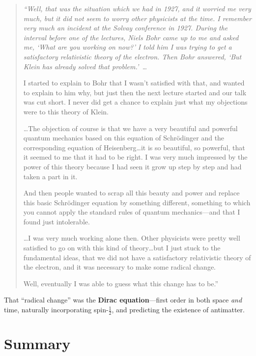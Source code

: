 \documentclass[12pt, a4paper]{article}
\theoremstyle{definition}
\begin{document}
\begin{quote}\itshape\color{quoteblue}
``Well, that was the situation which we had in 1927, and it worried me very
much, but it did not seem to worry other physicists at the time.  I remember
very much an incident at the Solvay conference in 1927.  During the interval
before one of the lectures, Niels Bohr came up to me and asked me, `What are
you working on now?'  I told him I was trying to get a satisfactory
relativistic theory of the electron.  Then Bohr answered, `But Klein has
already solved that problem.'~\ldots

I started to explain to Bohr that I wasn't satisfied with that, and wanted to
explain to him why, but just then the next lecture started and our talk was
cut short.  I never did get a chance to explain just what my objections were
to this theory of Klein.

\ldots\;The objection of course is that we have a very beautiful and powerful
quantum mechanics based on this equation of Schr\"{o}dinger and the
corresponding equation of Heisenberg\ldots\;it is so beautiful, so powerful,
that it seemed to me that it had to be right.  I was very much impressed by
the power of this theory because I had seen it grow up step by step and had
taken a part in it.

And then people wanted to scrap all this beauty and power and replace this
basic Schr\"{o}dinger equation by something different, something to which you
cannot apply the standard rules of quantum mechanics---and that I found just
intolerable.

\ldots\;I was very much working alone then.  Other physicists were pretty
well satisfied to go on with this kind of theory\ldots\;but I just stuck to
the fundamental ideas, that we did not have a satisfactory relativistic
theory of the electron, and it was necessary to make some radical change.

Well, eventually I was able to guess what this change has to be.''
\end{quote}

\noindent
That ``radical change'' was the \textbf{Dirac equation}---first order in both
space \emph{and} time, naturally incorporating spin-$\tfrac{1}{2}$, and
predicting the existence of antimatter.

\section{Summary}
\label{sec:summary}
\end{document}
